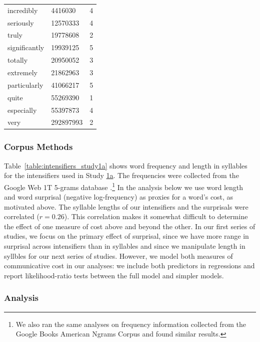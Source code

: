 \documentclass[10pt,letterpaper]{article}
\begin{document}
\begin{table}[ht]
\begin{center}
\begin{tabular}{llc}
    incredibly & 4416030 & 4 \\
    seriously & 12570333 & 4 \\
    truly & 19778608 & 2 \\
    significantly & 19939125 & 5 \\
    totally & 20950052 & 3 \\
    extremely & 21862963 & 3 \\
    particularly & 41066217 & 5 \\
    quite & 55269390 & 1 \\
    especially & 55397873 & 4 \\
    very & 292897993 & 2
  \end{tabular}
 \end{center}
\end{table}

\subsubsection{Corpus Methods}

Table~\ref{table:intensifiers_study1a} shows word frequency and length in syllables for the intensifiers used in Study \hyperref[sec:study1a]{1a}.
The frequencies were collected from the Google Web 1T 5-grams database \cite{brants_web_2006}.\footnote{
  We also ran the same analyses on frequency information collected from the Google Books American Ngrams Corpus \cite{michel_quantitative_2011} and found similar results.
}
In the analysis below we use word length and word surprisal (negative log-frequency) as proxies for a word's cost, as motivated above.
The syllable lengths of our intensifiers and the surprisals were correlated ($r = 0.26$).
This correlation makes it somewhat difficult to determine the effect of one measure of cost above and beyond the other.
In our first series of studies, we focus on the primary effect of surprisal, since we have more range in surprisal across intensifiers than in syllables and since we manipulate length in syllbles for our next series of studies.
However, we model both measures of communicative cost in our analyses: we include both predictors in regressions and report likelihood-ratio tests between the full model and simpler models.

\subsubsection{Analysis}
\end{document}
